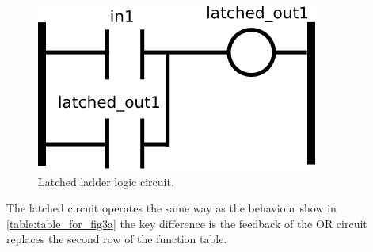 \begin{figure}[htp]
    \centering
    \includegraphics[width=\imgsmall]{./images/intro_fig_latched.png} 
    \caption{Latched ladder logic circuit.}
    \label{fig:intro_fig_latched}
\end{figure}

The latched circuit operates the same way as the behaviour show in \ref{table:table_for_fig3a} the key difference is the feedback of the OR circuit replaces the second row of the function table.
